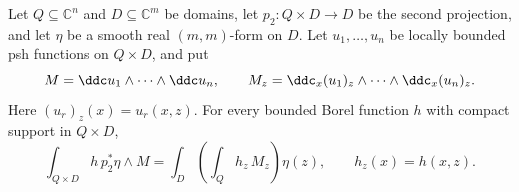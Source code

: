 \begin{lemma}\label{lma:boundedfibrefubini}
    Let $Q\subseteq\mathbb{C}^n$ and $D\subseteq\mathbb{C}^m$ be domains, let $p_2\colon Q\times D\to D$ be the second projection, and let $\eta$ be a smooth real $(m,m)$-form on $D$. Let $u_1,\ldots,u_n$ be locally bounded psh functions on $Q\times D$, and put
    \[
        M=\ddc u_1\wedge\cdots\wedge\ddc u_n,\qquad
        M_z=\ddc_x(u_1)_z\wedge\cdots\wedge\ddc_x(u_n)_z.
    \]
    Here $(u_r)_z(x)=u_r(x,z)$.
    For every bounded Borel function $h$ with compact support in $Q\times D$,
    \begin{equation}\label{eq:boundedfibrefubini}
        \int_{Q\times D}h\,p_2^*\eta\wedge M
        =\int_D\left(\int_Q h_z\,M_z\right)\eta(z),
        \qquad h_z(x)=h(x,z).
    \end{equation}
\end{lemma}
